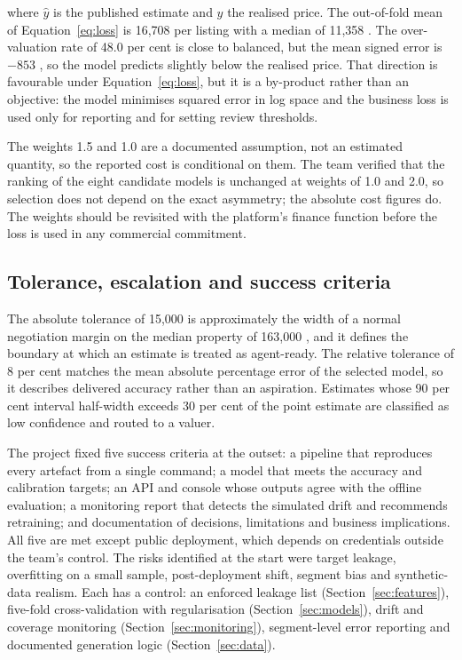 \noindent where $\hat{y}$ is the published estimate and $y$ the realised price. The
out-of-fold mean of Equation~\eqref{eq:loss} is 16,708 \USD{} per listing with a
median of 11,358 \USD. The over-valuation rate of 48.0 per cent is close to balanced,
but the mean signed error is $-853$ \USD, so the model predicts slightly below the
realised price. That direction is favourable under Equation~\eqref{eq:loss}, but it is
a by-product rather than an objective: the model minimises squared error in log space
and the business loss is used only for reporting and for setting review thresholds.

The weights 1.5 and 1.0 are a documented assumption, not an estimated quantity, so
the reported cost is conditional on them. The team verified that the ranking of the
eight candidate models is unchanged at weights of 1.0 and 2.0, so selection does not
depend on the exact asymmetry; the absolute cost figures do. The weights should be
revisited with the platform's finance function before the loss is used in any
commercial commitment.

\subsection{Tolerance, escalation and success criteria}

The absolute tolerance of 15,000 \USD{} is approximately the width of a normal
negotiation margin on the median property of 163,000 \USD, and it defines the
boundary at which an estimate is treated as agent-ready. The relative tolerance of 8
per cent matches the mean absolute percentage error of the selected model, so it
describes delivered accuracy rather than an aspiration. Estimates whose 90 per cent
interval half-width exceeds 30 per cent of the point estimate are classified as low
confidence and routed to a valuer.

The project fixed five success criteria at the outset: a pipeline that reproduces
every artefact from a single command; a model that meets the accuracy and calibration
targets; an API and console whose outputs agree with the offline evaluation; a
monitoring report that detects the simulated drift and recommends retraining; and
documentation of decisions, limitations and business implications. All five are met
except public deployment, which depends on credentials outside the team's control.
The risks identified at the start were target leakage, overfitting on a small
sample, post-deployment shift, segment bias and synthetic-data realism. Each has a
control: an enforced leakage list (Section~\ref{sec:features}), five-fold
cross-validation with regularisation (Section~\ref{sec:models}), drift and coverage
monitoring (Section~\ref{sec:monitoring}), segment-level error reporting and
documented generation logic (Section~\ref{sec:data}).
